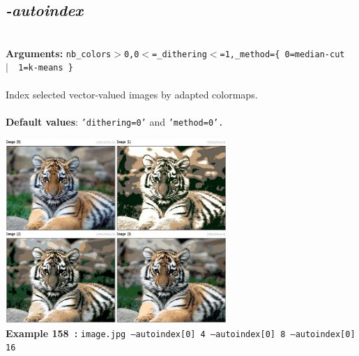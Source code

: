 \documentclass[a4paper,11pt,twoside]{book}
\begin{document}
\subsection{\emph{-autoindex} }\vspace*{-0.5em}
~\\\textbf{Arguments: } 
{\small \texttt{nb\_colors$>$0,0$<$=\_dithering$<$=1,\_method=\{ 0=median-cut ~$|$~ 1=k-means \}}}\\~\\
Index selected vector-valued images by adapted colormaps.
~\\~\\\textbf{Default values}: {\small \texttt{'dithering=0'} and \texttt{'method=0'.}}
\begin{center}\includegraphics[keepaspectratio=true,height=7cm,width=\textwidth]{img/gmic_def158.jpg}\\
{\footnotesize \textbf{Example 158~:} \texttt{image.jpg --autoindex[0] 4 --autoindex[0] 8 --autoindex[0] 16}}
\end{center}
\end{document}
